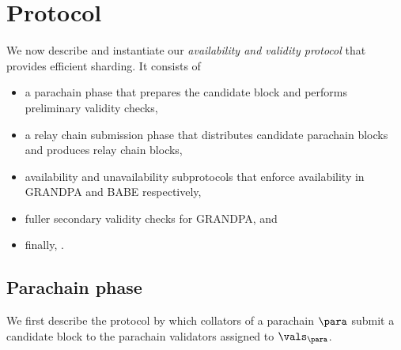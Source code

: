 
\section{Protocol} %
\label{sec:protocol}

We now describe and instantiate our {\em availability and validity protocol} that provides efficient sharding.  It consists of 
\begin{itemize}
\item a parachain phase that prepares the candidate block and performs preliminary validity checks,
\item a relay chain submission phase that distributes candidate parachain blocks and produces relay chain blocks,
\item availability and unavailability subprotocols that enforce availability in GRANDPA and BABE respectively,
\item fuller secondary validity checks for GRANDPA, and
\item finally, .
\end{itemize}



\subsection{Parachain phase} 
\label{sec:parachain}

We first describe the protocol by which collators of a parachain $\para$ submit a candidate block to the parachain validators assigned to $\vals_\para$.

\smallskip

